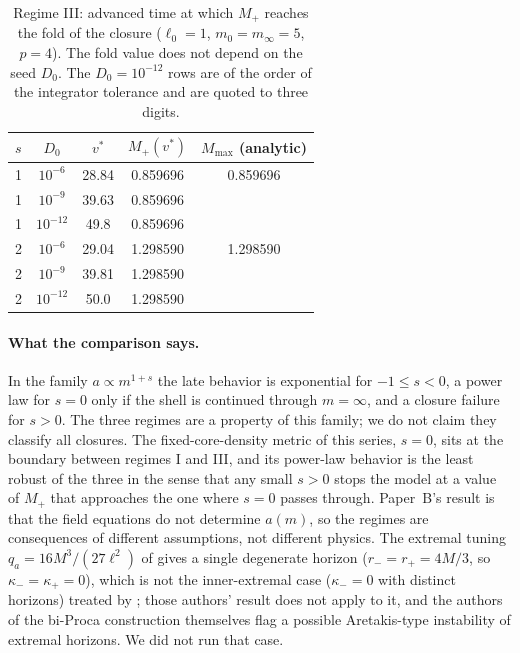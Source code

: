 \documentclass[11pt]{article}
\begin{document}
\begin{table}[t]
\centering\small
\begin{tabular}{lcccc}
\toprule
$s$ & $D_0$ & $v^*$ & $M_+(v^*)$ & $M_{\max}$ (analytic)\\
\midrule
1 & $10^{-6}$ & 28.84 & 0.859696 & 0.859696\\
1 & $10^{-9}$ & 39.63 & 0.859696 & \\
1 & $10^{-12}$ & 49.8 & 0.859696 & \\
2 & $10^{-6}$ & 29.04 & 1.298590 & 1.298590\\
2 & $10^{-9}$ & 39.81 & 1.298590 & \\
2 & $10^{-12}$ & 50.0 & 1.298590 & \\
\bottomrule
\end{tabular}
\caption{Regime III: advanced time at which $M_+$ reaches the fold of the closure ($\ell_0=1$, $m_0=m_\infty=5$, $p=4$). The fold value does not depend on the seed $D_0$. The $D_0=10^{-12}$ rows are of the order of the integrator tolerance and are quoted to three digits.}
\label{tab:fold}
\end{table}

\paragraph{What the comparison says.} In the family $a\propto m^{1+s}$ the late behavior is exponential for $-1\le s<0$, a power law for $s=0$ only if the shell is continued through $m=\infty$, and a closure failure for $s>0$. The three regimes are a property of this family; we do not claim they classify all closures. The fixed-core-density metric of this series, $s=0$, sits at the boundary between regimes I and III, and its power-law behavior is the least robust of the three in the sense that any small $s>0$ stops the model at a value of $M_+$ that approaches the one where $s=0$ passes through. Paper~B's result is that the field equations do not determine $a(m)$, so the regimes are consequences of different assumptions, not different physics. The extremal tuning $q_a=16M^3/(27\ell^2)$ of \citet{EichhornFernandes2025} gives a single degenerate horizon ($r_-=r_+=4M/3$, so $\kappa_-=\kappa_+=0$), which is not the inner-extremal case ($\kappa_-=0$ with distinct horizons) treated by \citet{CarballoRubio2022b}; those authors' result does not apply to it, and the authors of the bi-Proca construction themselves flag a possible Aretakis-type instability of extremal horizons. We did not run that case.
\end{document}
